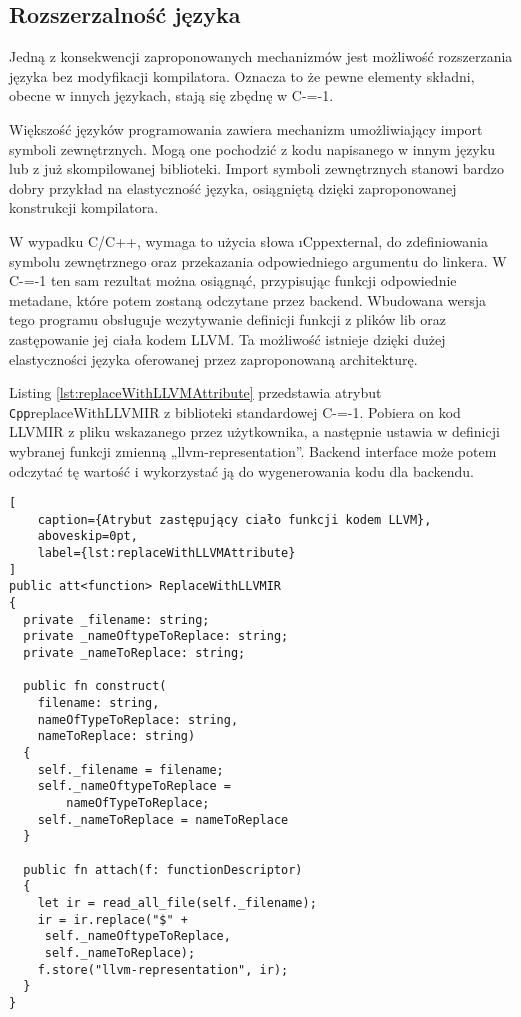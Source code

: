 \documentclass[conference]{IEEEtran}
\begin{document}
\subsection{Rozszerzalność języka}

Jedną z konsekwencji zaproponowanych mechanizmów jest możliwość rozszerzania języka bez modyfikacji kompilatora.
Oznacza to że pewne elementy składni, obecne w innych językach, stają się zbędnę w C-=-1.

Większość języków programowania zawiera mechanizm umożliwiający import symboli zewnętrznych.
Mogą one pochodzić z kodu napisanego w innym języku lub z już skompilowanej biblioteki.
Import symboli zewnętrznych stanowi bardzo dobry przykład na elastyczność języka, osiągniętą dzięki zaproponowanej konstrukcji kompilatora.

W wypadku C/C++, wymaga to użycia słowa \i{Cpp}{external}, do zdefiniowania symbolu zewnętrznego oraz przekazania odpowiedniego argumentu do linkera.
W C-=-1 ten sam rezultat można osiągnąć, przypisując funkcji odpowiednie metadane, które potem zostaną odczytane przez  backend.
Wbudowana wersja tego programu obsługuje wczytywanie definicji funkcji z plików lib oraz zastępowanie jej ciała kodem LLVM.
Ta możliwość istnieje dzięki dużej elastyczności języka oferowanej przez zaproponowaną architekturę.

Listing \ref{lst:replaceWithLLVMAttribute} przedstawia atrybut \lstinline{Cpp}{replaceWithLLVMIR} z biblioteki standardowej C-=-1. 
Pobiera on kod LLVMIR z pliku wskazanego przez użytkownika, a następnie ustawia w definicji wybranej funkcji zmienną „llvm-representation”.
Backend interface może potem odczytać tę wartość i wykorzystać ją do wygenerowania kodu dla backendu.

\begin{lstlisting}[
    caption={Atrybut zastępujący ciało funkcji kodem LLVM},
    aboveskip=0pt,
    label={lst:replaceWithLLVMAttribute}
]
public att<function> ReplaceWithLLVMIR
{
  private _filename: string;
  private _nameOftypeToReplace: string;
  private _nameToReplace: string;

  public fn construct(
    filename: string,
    nameOfTypeToReplace: string,
    nameToReplace: string)
  {
    self._filename = filename;
    self._nameOftypeToReplace =
        nameOfTypeToReplace;
    self._nameToReplace = nameToReplace
  }

  public fn attach(f: functionDescriptor)
  {
    let ir = read_all_file(self._filename);
    ir = ir.replace("$" +
     self._nameOftypeToReplace, 
     self._nameToReplace);
    f.store("llvm-representation", ir);
  }
}

\end{lstlisting}
\end{document}
